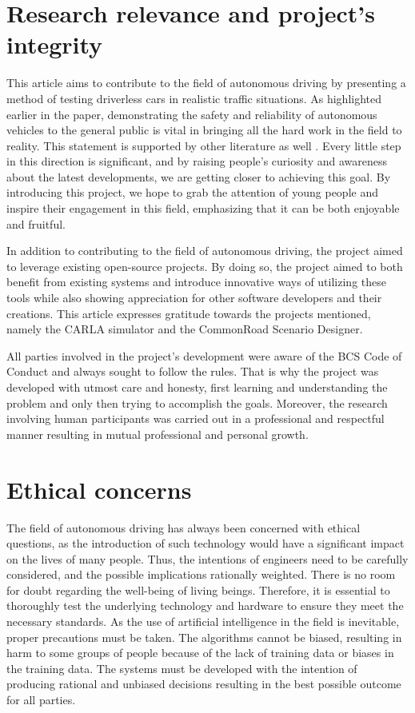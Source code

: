 \section{Research relevance and project's integrity} \label{sect-10.3}

This article aims to contribute to the field of autonomous driving by presenting a method of testing driverless cars in realistic traffic situations. As highlighted earlier in the paper, demonstrating the safety and reliability of autonomous vehicles to the general public is vital in bringing all the hard work in the field to reality. This statement is supported by other literature as well \cite{zhang2019roles}. Every little step in this direction is significant, and by raising people's curiosity and awareness about the latest developments, we are getting closer to achieving this goal. By introducing this project, we hope to grab the attention of young people and inspire their engagement in this field, emphasizing that it can be both enjoyable and fruitful.

In addition to contributing to the field of autonomous driving, the project aimed to leverage existing open-source projects. By doing so, the project aimed to both benefit from existing systems and introduce innovative ways of utilizing these tools while also showing appreciation for other software developers and their creations. This article expresses gratitude towards the projects mentioned, namely the CARLA simulator and the CommonRoad Scenario Designer.

All parties involved in the project's development were aware of the BCS Code of Conduct\cite{bcs_code} and always sought to follow the rules. That is why the project was developed with utmost care and honesty, first learning and understanding the problem and only then trying to accomplish the goals. Moreover, the research involving human participants was carried out in a professional and respectful manner resulting in mutual professional and personal growth.

\section{Ethical concerns} \label{sect-10.4}

The field of autonomous driving has always been concerned with ethical questions, as the introduction of such technology would have a significant impact on the lives of many people. Thus, the intentions of engineers need to be carefully considered, and the possible implications rationally weighted. There is no room for doubt regarding the well-being of living beings. Therefore, it is essential to thoroughly test the underlying technology and hardware to ensure they meet the necessary standards. As the use of artificial intelligence in the field is inevitable, proper precautions must be taken. The algorithms cannot be biased, resulting in harm to some groups of people because of the lack of training data or biases in the training data. The systems must be developed with the intention of producing rational and unbiased decisions resulting in the best possible outcome for all parties.

